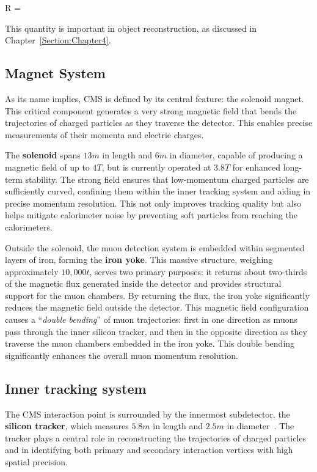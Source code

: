 \begin{equation_pad}
    \Delta R = 
\end{equation_pad}

This quantity is important in object reconstruction, as discussed in Chapter~\ref{Section:Chapter4}.%

\subsection{Magnet System}

As its name implies, \ac{CMS} is defined by its central feature: the solenoid magnet. This critical component generates a very strong magnetic field that bends the trajectories of charged particles as they traverse the detector. This enables precise measurements of their momenta and electric charges. 

The \textbf{solenoid} spans $13\unit{m}$ in length and $6\unit{m}$ in diameter, capable of producing a magnetic field of up to $4\unit{T}$, but is currently operated at $3.8\unit{T}$ for enhanced long-term stability. The strong field ensures that low-momentum charged particles are sufficiently curved, confining them within the inner tracking system and aiding in precise momentum resolution. This not only improves tracking quality but also helps mitigate calorimeter noise by preventing soft particles from reaching the calorimeters.

Outside the solenoid, the muon detection system is embedded within segmented layers of iron, forming the \textbf{iron yoke}. This massive structure, weighing approximately $10,000\unit{t}$, serves two primary purposes: it returns about two-thirds of the magnetic flux generated inside the detector and provides structural support for the muon chambers. By returning the flux, the iron yoke significantly reduces the magnetic field outside the detector. This magnetic field configuration causes a ``\textit{double bending}'' of muon trajectories: first in one direction as muons pass through the inner silicon tracker, and then in the opposite direction as they traverse the muon chambers embedded in the iron yoke. This double bending significantly enhances the overall muon momentum resolution.
 
\subsection{Inner tracking system}
The \ac{CMS} interaction point is surrounded by the innermost subdetector, the \textbf{silicon tracker}, which measures $5.8\unit{m}$ in length and $2.5\unit{m}$ in diameter~\cite{LHC_CMS,CMS_Detector_Run3}. The tracker plays a central role in reconstructing the trajectories of charged particles and in identifying both primary and secondary interaction vertices with high spatial precision.

